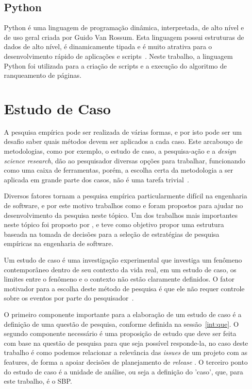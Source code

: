 \subsection{Python}
\label{met:tec:python}
Python é uma linguagem de programação dinâmica, interpretada, de alto nível e de  uso geral criada por Guido Van Rossum. Esta linguagem possui estruturas de dados de alto nível, é dinamicamente tipada e é muito atrativa para o desenvolvimento rápido de aplicações e scripts~\cite{python}. Neste trabalho, a linguagem Python foi utilizada para a criação de scripts e a execução do algoritmo de ranqueamento de páginas.


\section{Estudo de Caso}
\label{met:est}

A pesquisa empírica pode ser realizada de várias formas, e por isto pode ser um desafio saber quais métodos devem ser aplicados a cada caso. Este arcabouço de metodologias, como por exemplo, o estudo de caso, a pesquisa-ação e a \textit{design science research}, dão ao pesquisador diversas opções para trabalhar, funcionando como uma caixa de ferramentas, porém, a escolha certa da metodologia a ser aplicada em grande parte dos casos, não é uma tarefa trivial~\cite{empiricalSoftware}.

Diversos fatores tornam a pesquisa empírica particularmente difícil na engenharia de software, e por este motivo trabalhos como  \cite{shaw} e \cite{empiricalSoftware} foram propostos para ajudar no desenvolvimento da pesquisa neste tópico. Um dos trabalhos mais importantes neste tópico foi proposto por \cite{empiricalSoftware}, e teve como objetivo propor uma estrutura baseada na tomada de decisões para a seleção de estratégias de pesquisa empíricas na engenharia de software.

Um estudo de caso é uma investigação experimental que investiga um fenômeno contemporâneo dentro de seu contexto da vida real, em um estudo de caso, os limites entre o fenômeno e o contexto não estão claramente definidos. O fator motivador para a escolha deste método de pesquisa é que ele não requer controle sobre os eventos por parte do pesquisador~\cite{yin}.

O primeiro componente importante para a elaboração de um estudo de caso é a definição de uma questão de pesquisa, conforme definida na sessão~\ref{int:que}. O segundo componente necessário é uma proposição de estudo que deve ser feita com base na questão de pesquisa para que seja possível responde-la, no caso deste trabalho é como podemos relacionar a relevância das \textit{issues} de um projeto com as features, de forma a apoiar decisões de planejamento de \textit{release} . O terceiro ponto do estudo de caso é a unidade de análise, ou seja a definição do 'caso', que, para este trabalho, é o SBP.

